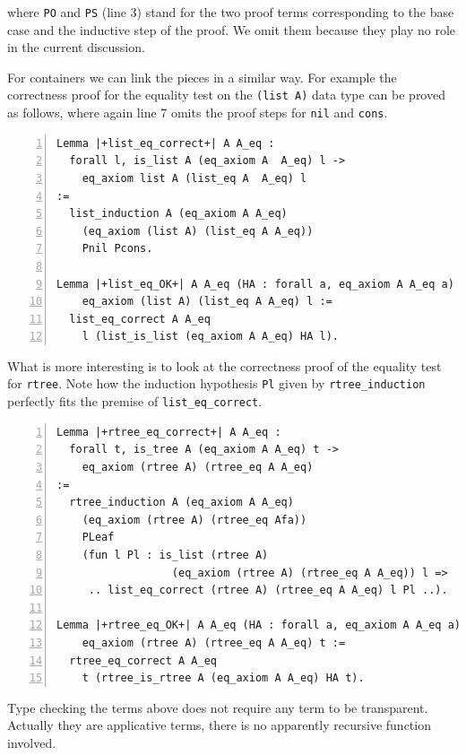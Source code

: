 \documentclass[sigplan,10pt,review]{acmart}\settopmatter{printfolios=true,printccs=false,printacmref=false}
\begin{document}
\noindent
where \lstinline+PO+ and \lstinline+PS+ (line 3) stand for
the two proof terms corresponding to the base case and the inductive
step of the proof. We omit them because they play no role in the
current discussion.

For containers we can link the pieces in a similar way.
For example the correctness proof
for the equality test on the \lstinline+(list A)+ data type can be
proved as follows, where again line 7 omits the proof steps for
\lstinline+nil+ and \lstinline+cons+.

\begin{minipage}{\textwidth}\begin{lstlisting}[numbers=left]
Lemma |+list_eq_correct+| A A_eq :
  forall l, is_list A (eq_axiom A  A_eq) l ->
    eq_axiom list A (list_eq A  A_eq) l
:=
  list_induction A (eq_axiom A A_eq)
    (eq_axiom (list A) (list_eq A A_eq))
    Pnil Pcons.

Lemma |+list_eq_OK+| A A_eq (HA : forall a, eq_axiom A A_eq a) l :
    eq_axiom (list A) (list_eq A A_eq) l :=
  list_eq_correct A A_eq
    l (list_is_list (eq_axiom A A_eq) HA l).
\end{lstlisting}\end{minipage}

\noindent
What is more interesting is to look at the correctness 
proof of the equality test
for \lstinline+rtree+. Note how the induction hypothesis
\lstinline+Pl+
given by \lstinline+rtree_induction+ perfectly fits
the premise of \lstinline+list_eq_correct+.

\begin{minipage}{\textwidth}\begin{lstlisting}[numbers=left]
Lemma |+rtree_eq_correct+| A A_eq :
  forall t, is_tree A (eq_axiom A A_eq) t ->
    eq_axiom (rtree A) (rtree_eq A A_eq)
:=
  rtree_induction A (eq_axiom A A_eq)
    (eq_axiom (rtree A) (rtree_eq Afa))
    PLeaf
    (fun l Pl : is_list (rtree A) 
                  (eq_axiom (rtree A) (rtree_eq A A_eq)) l =>
     .. list_eq_correct (rtree A) (rtree_eq A A_eq) l Pl ..).

Lemma |+rtree_eq_OK+| A A_eq (HA : forall a, eq_axiom A A_eq a) t :
    eq_axiom (rtree A) (rtree_eq A A_eq) t :=
  rtree_eq_correct A A_eq
    t (rtree_is_rtree A (eq_axiom A A_eq) HA t).
\end{lstlisting}\end{minipage}

Type checking the terms above does not require any term to be
transparent. Actually they are applicative terms, there is no
apparently recursive function involved.
\end{document}
